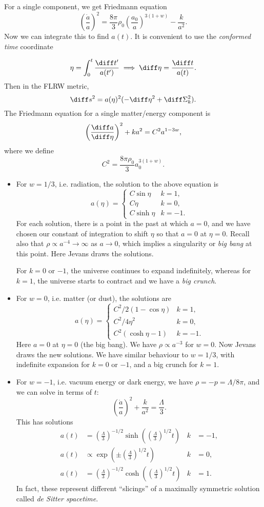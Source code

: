 \documentclass[12pt]{article}
\begin{document}
For a single component, we get Friedmann equation
\[
\left( \frac{\dot a}{a} \right)^2 = \frac{8 \pi}{3} \rho_0 \left( \frac{a_0}{a} \right)^{3(1+w)} - \frac{k}{a^2}.
\]
Now we can integrate this to find $a(t)$. It is convenient to use the \emph{conformed time} coordinate

\[
\eta = \int_0^t \frac{\diff t'}{a(t')} \implies \diff \eta = \frac{\diff t}{a(t)}.
\]
Then in the FLRW metric,
\[
	\diff s^2 = a(\eta)^2 (- \diff \eta^2 + \diff \Sigma_k^2).
\]
The Friedmann equation for a single matter/energy component is
\[
	\left( \frac{\diff a}{\diff \eta} \right)^2 + k a^2 = C^2 a^{1 - 3w},
\]
where we define
\[
C^2 = \frac{8 \pi \rho_0}{3} a_0^{3(1 + w)}.
\]
\begin{itemize}
	\item For $w = 1/3$, i.e. radiation, the solution to the above equation is
		\[
		a(\eta) =
		\begin{cases}
			C \sin \eta & k = 1, \\
			C \eta & k = 0, \\
			C \sinh \eta & k = -1.
		\end{cases}
		\]
		For each solution, there is a point in the past at which $a = 0$, and we have chosen our constant of integration to shift $\eta$ so that $a = 0$ at $\eta = 0$. Recall also that $\rho \propto a^{-4} \to \infty$ as $a \to 0$, which implies a singularity or \emph{big bang} at this point. Here Jevans draws the solutions.

		For $k = 0$ or $-1$, the universe continues to expand indefinitely, whereas for $k = 1$, the universe starts to contract and we have a \emph{big crunch}.
	\item For $w = 0$, i.e. matter (or dust), the solutions are
		\[
		a(\eta) =
		\begin{cases}
			C^2/2 (1 - \cos \eta) & k = 1, \\
			C^2/4 \eta^2 & k = 0, \\
			C^2(\cosh \eta - 1) & k = -1.
		\end{cases}
		\]
		Here $a = 0$ at $\eta = 0$ (the big bang). We have $\rho \propto a^{-3}$ for $w = 0$. Now Jevans draws the new solutions. We have similar behaviour to $w = 1/3$, with indefinite expansion for $k = 0$ or $-1$, and a big crunch for $k = 1$.
	\item For $w = -1$, i.e. vacuum energy or dark energy, we have $\rho = -p = \Lambda/8\pi$, and we can solve in terms of $t$:
		\[
		\left( \frac{\dot a}{a} \right)^2 + \frac{k}{a^2} = \frac{\Lambda}{3}.
		\]
		This has solutions
		\begin{align*}
			a(t) &= \left( \frac{\Lambda}{3} \right)^{-1/2} \sinh \left( \left( \frac{\Lambda}{3} \right)^{1/2} t \right) & k &= -1, \\
			a(t) &\propto \exp\left( \pm \left( \frac{\Lambda}{3} \right)^{1/2} t \right) & k &= 0, \\
			a(t) &= \left( \frac{\Lambda}{3} \right)^{-1/2} \cosh \left( \left( \frac{\Lambda}{3} \right)^{1/2} t \right) & k &= 1.
		\end{align*}
		In fact, these represent different ``slicings'' of a maximally symmetric solution called \emph{de Sitter spacetime}.
\end{itemize}
\end{document}
